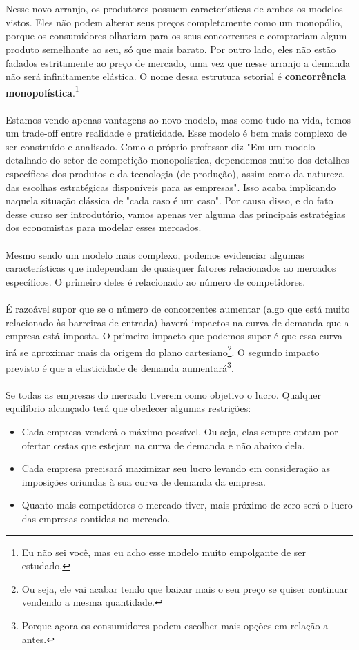 \documentclass[a4paper,11pt,oneside]{book}
\theoremstyle{definition}
\theoremstyle{break}
\begin{document}
\\~\\
Nesse novo arranjo, os produtores possuem características de ambos os modelos vistos. Eles não podem alterar seus preços completamente como um monopólio, porque os consumidores olhariam para os seus concorrentes e comprariam algum produto semelhante ao seu, só que mais barato. Por outro lado, eles não estão fadados estritamente ao preço de mercado, uma vez que nesse arranjo a demanda não será infinitamente elástica. O nome dessa estrutura setorial é \textbf{concorrência monopolística}.\footnote{Eu não sei você, mas eu acho esse modelo muito empolgante de ser estudado.}
\\~\\
Estamos vendo apenas vantagens ao novo modelo, mas como tudo na vida, temos um trade-off entre realidade e praticidade. Esse modelo é bem mais complexo de ser construído e analisado. Como o próprio professor diz "Em um modelo detalhado do setor de competição monopolística, dependemos muito dos detalhes específicos dos produtos e da tecnologia (de produção), assim como da natureza das escolhas estratégicas disponíveis para as empresas". Isso acaba implicando naquela situação clássica de "cada caso é um caso". Por causa disso, e do fato desse curso ser introdutório, vamos apenas ver alguma das principais estratégias dos economistas para modelar esses mercados.
\\~\\
Mesmo sendo um modelo mais complexo, podemos evidenciar algumas características que independam de quaisquer fatores relacionados ao mercados específicos. O primeiro deles é relacionado ao número de competidores.
\\~\\
É razoável supor que se o número de concorrentes aumentar (algo que está muito relacionado às barreiras de entrada) haverá impactos na curva de demanda que a empresa está imposta. O primeiro impacto que podemos supor é que essa curva irá se aproximar mais da origem do plano cartesiano\footnote{Ou seja, ele vai acabar tendo que baixar mais o seu preço se quiser continuar vendendo a mesma quantidade.}. O segundo impacto previsto é que a elasticidade de demanda aumentará\footnote{Porque agora os consumidores podem escolher mais opções em relação a antes.}.
\\~\\
Se todas as empresas do mercado tiverem como objetivo o lucro. 
Qualquer equilíbrio alcançado terá que obedecer algumas restrições:
\begin{itemize}
\item Cada empresa venderá o máximo possível. Ou seja, elas sempre optam por ofertar cestas que estejam na curva de demanda e não abaixo dela.
\item Cada empresa precisará maximizar seu lucro levando em consideração as imposições oriundas à sua curva de demanda da empresa.
\item Quanto mais competidores o mercado tiver, mais próximo de zero será o lucro das empresas contidas no mercado.
\end{itemize}
\end{document}
